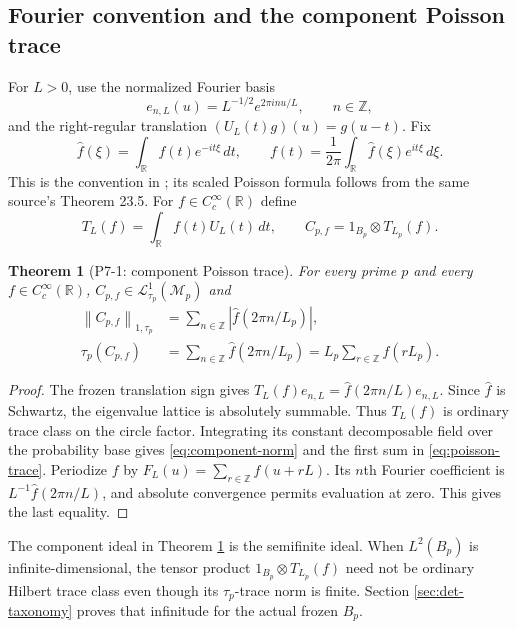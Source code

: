 \documentclass[11pt,a4paper]{article}
\newtheorem{theorem}{Theorem}[section]
\theoremstyle{definition}
\newcommand{\R}{\mathbb R}
\newcommand{\Z}{\mathbb Z}
\newcommand{\M}{\mathcal M}
\newcommand{\Lc}{\mathcal L}
\newcommand{\norm}[1]{\left\lVert #1\right\rVert}
\newcommand{\abs}[1]{\left\lvert #1\right\rvert}
\begin{document}
\subsection{Fourier convention and the component Poisson trace}

For $L>0$, use the normalized Fourier basis
\[
 e_{n,L}(u)=L^{-1/2}e^{2\pi inu/L},\qquad n\in\Z,
\]
and the right-regular translation $(U_L(t)g)(u)=g(u-t)$.  Fix
\begin{equation}
 \widehat f(\xi)=\int_{\R}f(t)e^{-it\xi}\,dt,
 \qquad
 f(t)=\frac{1}{2\pi}\int_{\R}\widehat f(\xi)e^{it\xi}\,d\xi .
 \label{eq:fourier}
\end{equation}
This is the convention in \citet[Definition 14.1]{Laugesen2009}; its scaled
Poisson formula follows from the same source's Theorem 23.5.  For
$f\in C_c^\infty(\R)$ define
\begin{equation}
 T_L(f)=\int_{\R}f(t)U_L(t)\,dt,
 \qquad
 C_{p,f}=1_{B_p}\otimes T_{L_p}(f).
 \label{eq:Cpf}
\end{equation}

\begin{theorem}[P7-1: component Poisson trace]
\label{thm:p71}
For every prime $p$ and every $f\in C_c^\infty(\R)$,
$C_{p,f}\in\Lc^1_{\tau_p}(\M_p)$ and
\begin{align}
 \norm{C_{p,f}}_{1,\tau_p}
   &=\sum_{n\in\Z}\abs{\widehat f(2\pi n/L_p)},
   \label{eq:component-norm}\\
 \tau_p(C_{p,f})
   &=\sum_{n\in\Z}\widehat f(2\pi n/L_p)
     =L_p\sum_{r\in\Z}f(rL_p).
   \label{eq:poisson-trace}
\end{align}
\end{theorem}

\begin{proof}
The frozen translation sign gives
$T_L(f)e_{n,L}=\widehat f(2\pi n/L)e_{n,L}$.  Since $\widehat f$ is Schwartz,
the eigenvalue lattice is absolutely summable.  Thus $T_L(f)$ is ordinary
trace class on the circle factor.  Integrating its constant decomposable field
over the probability base gives \eqref{eq:component-norm} and the first sum in
\eqref{eq:poisson-trace}.  Periodize $f$ by
$F_L(u)=\sum_{r\in\Z}f(u+rL)$.  Its $n$th Fourier coefficient is
$L^{-1}\widehat f(2\pi n/L)$, and absolute convergence permits evaluation at
zero.  This gives the last equality.
\end{proof}

The component ideal in Theorem \ref{thm:p71} is the semifinite ideal.  When
$L^2(B_p)$ is infinite-dimensional, the tensor product
$1_{B_p}\otimes T_{L_p}(f)$ need not be ordinary Hilbert trace class even
though its $\tau_p$-trace norm is finite.  Section \ref{sec:det-taxonomy}
proves that infinitude for the actual frozen $B_p$.
\end{document}
